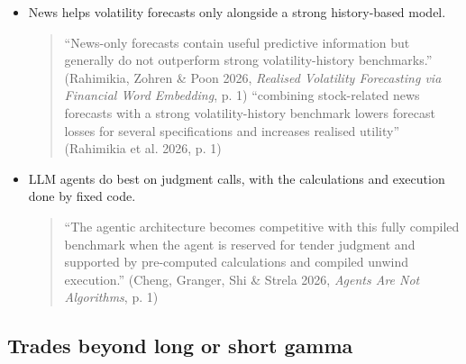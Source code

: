 \documentclass{article}
\begin{document}
\begin{itemize}

\item News helps volatility forecasts only alongside a strong history-based model.

\begin{quote}``News-only forecasts contain useful predictive information but generally do not outperform strong volatility-history benchmarks.'' (Rahimikia, Zohren \& Poon 2026, \emph{Realised Volatility Forecasting via Financial Word Embedding}, p. 1) ``combining stock-related news forecasts with a strong volatility-history benchmark lowers forecast losses for several specifications and increases realised utility'' (Rahimikia et al. 2026, p. 1)\end{quote}

\item LLM agents do best on judgment calls, with the calculations and execution done by fixed code.

\begin{quote}``The agentic architecture becomes competitive with this fully compiled benchmark when the agent is reserved for tender judgment and supported by pre-computed calculations and compiled unwind execution.'' (Cheng, Granger, Shi \& Strela 2026, \emph{Agents Are Not Algorithms}, p. 1)\end{quote}

\end{itemize}

\subsection{Trades beyond long or short gamma}
\end{document}
